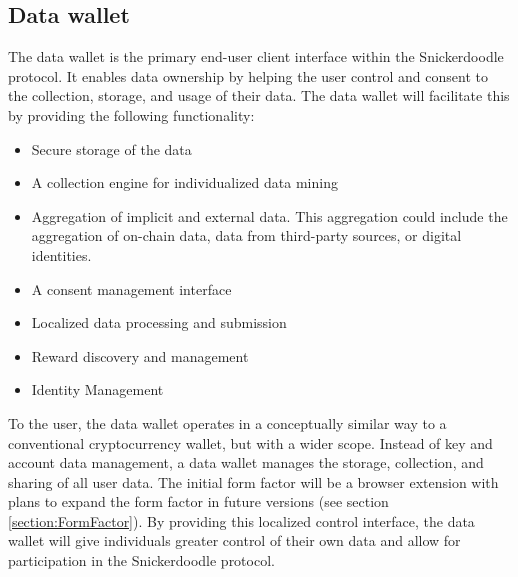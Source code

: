 \subsection{Data wallet}
\label{section:DataWallet}
%



The data wallet is the primary end-user client interface within the Snickerdoodle protocol. It enables data ownership by helping the user control and consent to the collection, storage, and usage of their data. The data wallet will facilitate this by providing the following functionality:
\begin{itemize}
  \item Secure storage of the data
  \item A collection engine for individualized data mining
  \item Aggregation of implicit and external data. This aggregation could include the aggregation of on-chain data, data from third-party sources, or digital identities.
  \item A consent management interface
  \item Localized data processing and submission
  \item Reward discovery and management
  \item Identity Management
\end{itemize}






To the user, the data wallet operates in a conceptually similar way to a conventional cryptocurrency wallet, but with a wider scope. Instead of key and account data management, a data wallet manages the storage, collection, and sharing of all user data. The initial form factor will be a browser extension with plans to expand the form factor in future versions (see section \ref{section:FormFactor}). By providing this localized control interface, the data wallet will give individuals greater control of their own data and allow for participation in the Snickerdoodle protocol.

